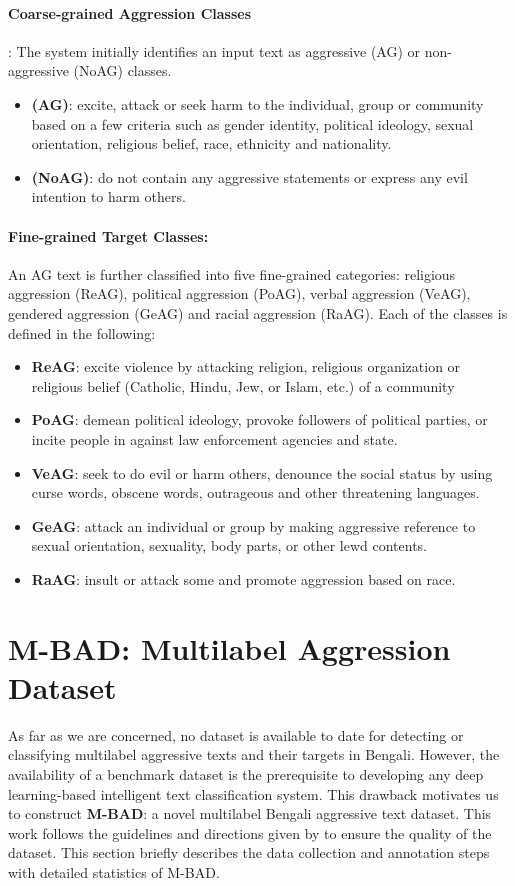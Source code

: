 \documentclass[11pt]{article}
\begin{document}
\paragraph{Coarse-grained Aggression Classes}: The system initially identifies an input text as aggressive (AG) or non-aggressive (NoAG) classes.
\begin{itemize}
    \item \textbf{(AG)}: excite, attack or seek harm to the individual, group or community based on a few criteria such as gender identity, political ideology, sexual orientation, religious belief, race, ethnicity and nationality.
    \item \textbf{(NoAG)}: do not contain any aggressive statements or express any evil intention to harm others. 
\end{itemize}

\paragraph{Fine-grained Target Classes:} An AG text is further classified into five fine-grained categories: religious aggression (ReAG), political aggression (PoAG), verbal aggression (VeAG), gendered aggression (GeAG) and racial aggression (RaAG). Each of the classes is defined in the following:
\begin{itemize}
\item \textbf{ReAG}: excite violence by attacking religion, religious organization or religious belief (Catholic, Hindu, Jew, or Islam, etc.) of a community 
    \item \textbf{PoAG}: demean political ideology, provoke followers of political parties, or incite people in against law enforcement agencies and state. 
    \item \textbf{VeAG}: seek to do evil or harm others, denounce the social status by using curse words, obscene words, outrageous and other threatening languages. 
    \item  \textbf{GeAG}: attack an individual or group by making aggressive reference to sexual orientation, sexuality, body parts, or other lewd contents.
    \item \textbf{RaAG}: insult or attack some and promote aggression based on race. 
\end{itemize}

\section{M-BAD: Multilabel Aggression Dataset}
As far as we are concerned, no dataset is available to date for detecting or classifying multilabel aggressive texts and their targets in Bengali. However, the availability of a benchmark dataset is the prerequisite to developing any deep learning-based intelligent text classification system. This drawback motivates us to construct \textbf{M-BAD}: a novel multilabel Bengali aggressive text dataset. This work follows the guidelines and directions given by \cite{SHARIF2021,vidgen2020directions} to ensure the quality of the dataset. This section briefly describes the data collection and annotation steps with detailed statistics of M-BAD. 
\end{document}

